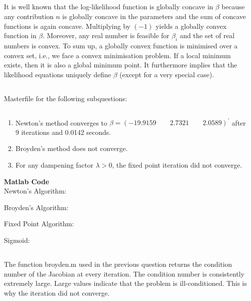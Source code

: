 \documentclass{article}
\begin{document}
\subsection{}
It is well known that the log-likelihood function is globally concave in $\beta$ because any contribution $n$ is globally concave in the parameters and the sum of concave functions is again concave. Multiplying by $(-1)$ yields a globally convex function in $\beta$. Moreover, any real number is feasible for $\beta_i$ and the set of real numbers is convex. To sum up, a globally convex function is minimised over a convex set, i.e., we face a convex minimisation problem. If a local minimum exists, then it is also a global minimum point. It furthermore implies that the likelihood equations uniquely define $\beta$ (except for a very special case). 
\subsection{}
\subsection{}
Masterfile for the following subquestions:


\subsection{}
\begin{enumerate}
\item Newton's method converges to $\beta = (-19.9159 \qquad  2.7321 \qquad 2.0589)^\prime$ after 9 iterations and 0.0142 seconds.
\item Broyden's method does not converge.
\item For any dampening factor $\lambda > 0$, the fixed point iteration did not converge.
\end{enumerate}

\textbf{Matlab Code}\\
   Newton's Algorithm:
   
   Broyden's Algorithm:
   
   Fixed Point Algorithm:
   
   Sigmoid:
   

\subsection{}
The function broyden.m used in the previous question returns the condition number of the Jacobian at every iteration. The condition number is consistently extremely large. Large values indicate that the problem is ill-conditioned. This is why the iteration did not converge.
\end{document}
